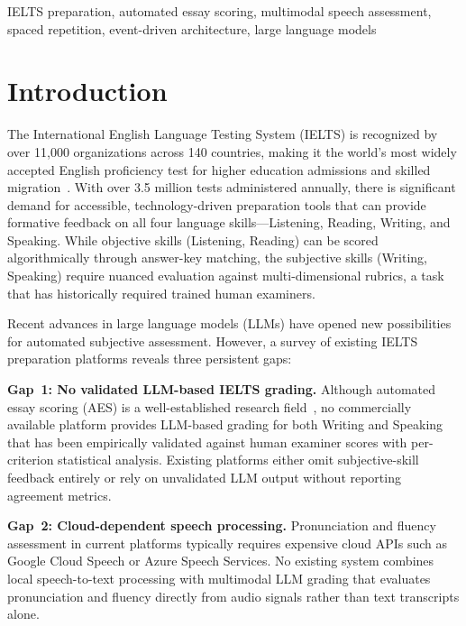 \documentclass{IEEEtran}
\begin{document}
\begin{IEEEkeywords}
IELTS preparation, automated essay scoring, multimodal speech assessment, spaced repetition, event-driven architecture, large language models
\end{IEEEkeywords}

\section{Introduction}

The International English Language Testing System (IELTS) is recognized by over 11{,}000 organizations across 140 countries, making it the world's most widely accepted English proficiency test for higher education admissions and skilled migration~\cite{ielts_stats}. With over 3.5 million tests administered annually, there is significant demand for accessible, technology-driven preparation tools that can provide formative feedback on all four language skills---Listening, Reading, Writing, and Speaking. While objective skills (Listening, Reading) can be scored algorithmically through answer-key matching, the subjective skills (Writing, Speaking) require nuanced evaluation against multi-dimensional rubrics, a task that has historically required trained human examiners.

Recent advances in large language models (LLMs) have opened new possibilities for automated subjective assessment. However, a survey of existing IELTS preparation platforms reveals three persistent gaps:

\textbf{Gap~1: No validated LLM-based IELTS grading.} Although automated essay scoring (AES) is a well-established research field~\cite{erater,aes_handbook}, no commercially available platform provides LLM-based grading for both Writing and Speaking that has been empirically validated against human examiner scores with per-criterion statistical analysis. Existing platforms either omit subjective-skill feedback entirely or rely on unvalidated LLM output without reporting agreement metrics.

\textbf{Gap~2: Cloud-dependent speech processing.} Pronunciation and fluency assessment in current platforms typically requires expensive cloud APIs such as Google Cloud Speech or Azure Speech Services. No existing system combines local speech-to-text processing with multimodal LLM grading that evaluates pronunciation and fluency directly from audio signals rather than text transcripts alone.
\end{document}
